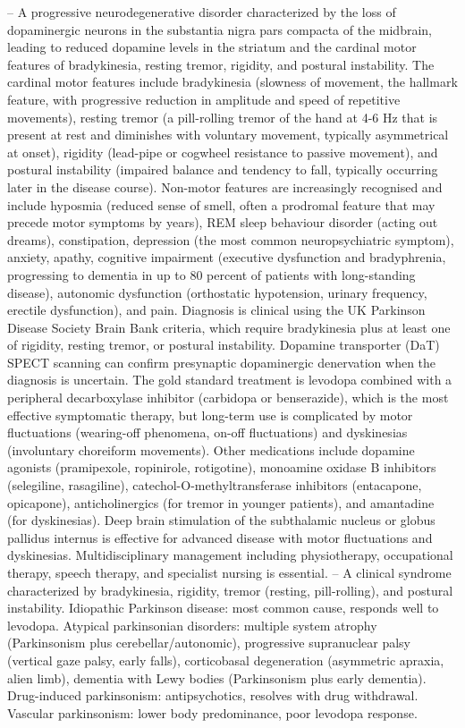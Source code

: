 -- A progressive neurodegenerative disorder characterized by the loss of dopaminergic neurons in the substantia nigra pars compacta of the midbrain, leading to reduced dopamine levels in the striatum and the cardinal motor features of bradykinesia, resting tremor, rigidity, and postural instability. The cardinal motor features include bradykinesia (slowness of movement, the hallmark feature, with progressive reduction in amplitude and speed of repetitive movements), resting tremor (a pill-rolling tremor of the hand at 4-6 Hz that is present at rest and diminishes with voluntary movement, typically asymmetrical at onset), rigidity (lead-pipe or cogwheel resistance to passive movement), and postural instability (impaired balance and tendency to fall, typically occurring later in the disease course). Non-motor features are increasingly recognised and include hyposmia (reduced sense of smell, often a prodromal feature that may precede motor symptoms by years), REM sleep behaviour disorder (acting out dreams), constipation, depression (the most common neuropsychiatric symptom), anxiety, apathy, cognitive impairment (executive dysfunction and bradyphrenia, progressing to dementia in up to 80 percent of patients with long-standing disease), autonomic dysfunction (orthostatic hypotension, urinary frequency, erectile dysfunction), and pain. Diagnosis is clinical using the UK Parkinson Disease Society Brain Bank criteria, which require bradykinesia plus at least one of rigidity, resting tremor, or postural instability. Dopamine transporter (DaT) SPECT scanning can confirm presynaptic dopaminergic denervation when the diagnosis is uncertain. The gold standard treatment is levodopa combined with a peripheral decarboxylase inhibitor (carbidopa or benserazide), which is the most effective symptomatic therapy, but long-term use is complicated by motor fluctuations (wearing-off phenomena, on-off fluctuations) and dyskinesias (involuntary choreiform movements). Other medications include dopamine agonists (pramipexole, ropinirole, rotigotine), monoamine oxidase B inhibitors (selegiline, rasagiline), catechol-O-methyltransferase inhibitors (entacapone, opicapone), anticholinergics (for tremor in younger patients), and amantadine (for dyskinesias). Deep brain stimulation of the subthalamic nucleus or globus pallidus internus is effective for advanced disease with motor fluctuations and dyskinesias. Multidisciplinary management including physiotherapy, occupational therapy, speech therapy, and specialist nursing is essential.
-- A clinical syndrome characterized by bradykinesia, rigidity, tremor (resting, pill-rolling), and postural instability. Idiopathic Parkinson disease: most common cause, responds well to levodopa. Atypical parkinsonian disorders: multiple system atrophy (Parkinsonism plus cerebellar/autonomic), progressive supranuclear palsy (vertical gaze palsy, early falls), corticobasal degeneration (asymmetric apraxia, alien limb), dementia with Lewy bodies (Parkinsonism plus early dementia). Drug-induced parkinsonism: antipsychotics, resolves with drug withdrawal. Vascular parkinsonism: lower body predominance, poor levodopa response.
